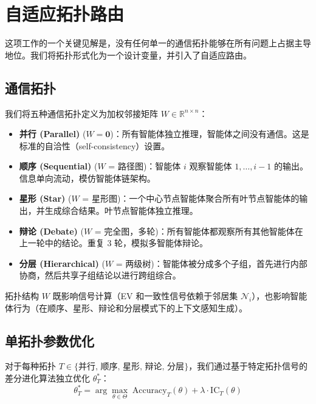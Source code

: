 \section{自适应拓扑路由}
\label{sec:topology}

这项工作的一个关键见解是，没有任何单一的通信拓扑能够在所有问题上占据主导地位。我们将拓扑形式化为一个设计变量，并引入了自适应路由。

\subsection{通信拓扑}

我们将五种通信拓扑定义为加权邻接矩阵 $W \in \mathbb{R}^{n \times n}$：

\begin{itemize}
    \item \textbf{并行 (Parallel)} ($W = \mathbf{0}$)：所有智能体独立推理，智能体之间没有通信。这是标准的自洽性（self-consistency）设置。
    \item \textbf{顺序 (Sequential)} ($W$ = 路径图)：智能体 $i$ 观察智能体 $1, \ldots, i{-}1$ 的输出。信息单向流动，模仿智能体链架构。
    \item \textbf{星形 (Star)} ($W$ = 星形图)：一个中心节点智能体聚合所有叶节点智能体的输出，并生成综合结果。叶节点智能体独立推理。
    \item \textbf{辩论 (Debate)} ($W$ = 完全图，多轮)：所有智能体都观察所有其他智能体在上一轮中的结论。重复 3 轮，模拟多智能体辩论。
    \item \textbf{分层 (Hierarchical)} ($W$ = 两级树)：智能体被分成多个子组，首先进行内部协商，然后共享子组结论以进行跨组综合。
\end{itemize}

拓扑结构 $W$ 既影响信号计算（EV 和一致性信号依赖于邻居集 $\mathcal{N}_i$），也影响智能体行为（在顺序、星形、辩论和分层模式下的上下文感知生成）。

\subsection{单拓扑参数优化}

对于每种拓扑 $T \in \{\text{并行, 顺序, 星形, 辩论, 分层}\}$，我们通过基于特定拓扑信号的差分进化算法独立优化 $\theta^*_T$：
\begin{equation}
    \theta^*_T = \arg\max_{\theta \in \Theta} \; \text{Accuracy}_T(\theta) + \lambda \cdot \text{IC}_T(\theta)
\end{equation}

